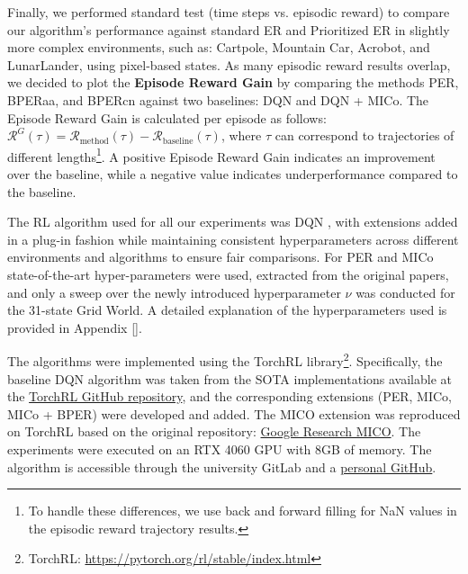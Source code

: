 Finally, we performed standard test (time steps vs. episodic reward) to compare our algorithm's performance against standard ER and Prioritized ER in slightly more complex environments, such as: Cartpole, Mountain Car, Acrobot, and LunarLander, using pixel-based states. As many episodic reward results overlap, we decided to plot the \textbf{Episode Reward Gain} by comparing the methods PER, BPERaa, and BPERcn against two baselines: DQN and DQN + MICo. The Episode Reward Gain is calculated per episode as follows: \(\mathcal{R}^G(\tau) = \mathcal{R}_{\text{method}}(\tau) - \mathcal{R}_{\text{baseline}}(\tau)\), where \(\tau\) can correspond to trajectories of different lengths\footnote{To handle these differences, we use back and forward filling for NaN values in the episodic reward trajectory results.}. A positive Episode Reward Gain indicates an improvement over the baseline, while a negative value indicates underperformance compared to the baseline.

The RL algorithm used for all our experiments was DQN \cite{mnih2013playing}, with extensions added in a plug-in fashion while maintaining consistent hyperparameters across different environments and algorithms to ensure fair comparisons. For PER and MICo state-of-the-art hyper-parameters were used, extracted from the original papers, and only a sweep over the newly introduced hyperparameter \(\nu\) was conducted for the 31-state Grid World. A detailed explanation of the hyperparameters used is provided in Appendix \ref{}.

The algorithms were implemented using the TorchRL library\footnote{TorchRL: \href{https://pytorch.org/rl/stable/index.html}{https://pytorch.org/rl/stable/index.html}}. Specifically, the baseline DQN algorithm was taken from the SOTA implementations available at the \href{https://github.com/pytorch/rl/tree/main/sota-implementations/dqn}{TorchRL GitHub repository}, and the corresponding extensions (PER, MICo, MICo + BPER) were developed and added. The MICO extension was reproduced on TorchRL based on the original repository: \href{https://github.com/google-research/google-research/tree/master/mico}{Google Research MICO}. The experiments were executed on an RTX 4060 GPU with 8GB of memory. The algorithm is accessible through the university GitLab and a \href{https://github.com/ZosoV/final_project}{personal GitHub}.



